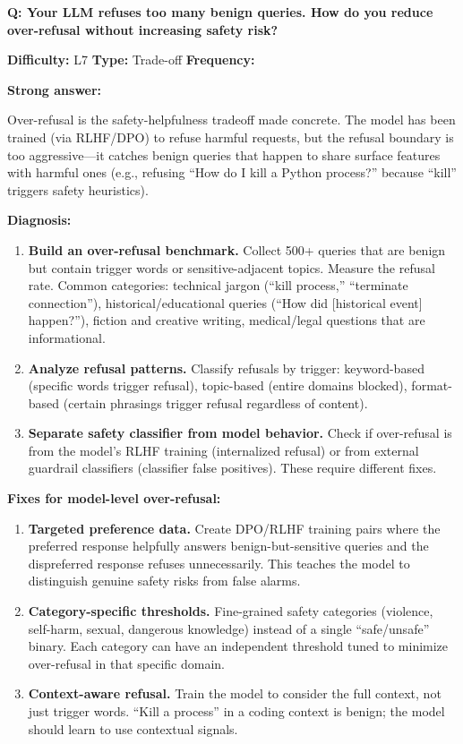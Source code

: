 
\begin{interviewq}
\textbf{Q: Your LLM refuses too many benign queries. How do you reduce over-refusal without increasing safety risk?}

\textbf{Difficulty:} L7 \quad \textbf{Type:} Trade-off \quad \textbf{Frequency:} \freqmed{}

\textbf{Strong answer:}

Over-refusal is the safety-helpfulness tradeoff made concrete. The model has been trained (via RLHF/DPO) to refuse harmful requests, but the refusal boundary is too aggressive---it catches benign queries that happen to share surface features with harmful ones (e.g., refusing ``How do I kill a Python process?'' because ``kill'' triggers safety heuristics).

\textbf{Diagnosis:}
\begin{enumerate}
    \item \textbf{Build an over-refusal benchmark.} Collect 500+ queries that are benign but contain trigger words or sensitive-adjacent topics. Measure the refusal rate. Common categories: technical jargon (``kill process,'' ``terminate connection''), historical/educational queries (``How did [historical event] happen?''), fiction and creative writing, medical/legal questions that are informational.
    \item \textbf{Analyze refusal patterns.} Classify refusals by trigger: keyword-based (specific words trigger refusal), topic-based (entire domains blocked), format-based (certain phrasings trigger refusal regardless of content).
    \item \textbf{Separate safety classifier from model behavior.} Check if over-refusal is from the model's RLHF training (internalized refusal) or from external guardrail classifiers (classifier false positives). These require different fixes.
\end{enumerate}

\textbf{Fixes for model-level over-refusal:}
\begin{enumerate}
    \item \textbf{Targeted preference data.} Create DPO/RLHF training pairs where the preferred response helpfully answers benign-but-sensitive queries and the dispreferred response refuses unnecessarily. This teaches the model to distinguish genuine safety risks from false alarms.
    \item \textbf{Category-specific thresholds.} Fine-grained safety categories (violence, self-harm, sexual, dangerous knowledge) instead of a single ``safe/unsafe'' binary. Each category can have an independent threshold tuned to minimize over-refusal in that specific domain.
    \item \textbf{Context-aware refusal.} Train the model to consider the full context, not just trigger words. ``Kill a process'' in a coding context is benign; the model should learn to use contextual signals.
\end{enumerate}


\end{interviewq}
